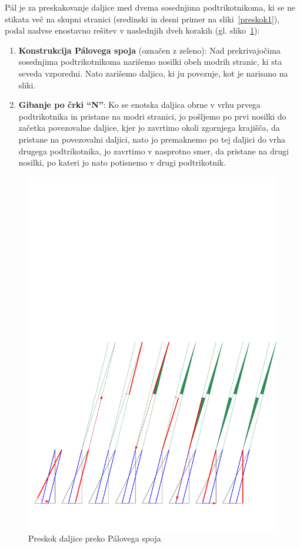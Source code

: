 \documentclass[a4paper, 12pt]{article}
\begin{document}
Pál je za preskakovanje daljice med dvema sosednjima podtrikotnikoma, ki se ne stikata več na skupni stranici (sredinski in desni primer na sliki~\ref{preskok1}), podal nadvse enostavno rešitev v naslednjih dveh korakih (gl. sliko~\ref{pal}):

\begin{enumerate}
    \item \textbf{Konstrukcija Pálovega spoja} (označen z zeleno): Nad prekrivajočima sosednjima podtrikotnikoma narišemo nosilki obeh modrih stranic, ki sta seveda vzporedni. Nato zarišemo daljico, ki ju povezuje, kot je narisano na sliki.
    \item \textbf{Gibanje po črki ``N''}: Ko se enotska daljica obrne v vrhu prvega podtrikotnika in pristane na modri stranici, jo pošljemo po prvi nosilki do začetka povezovalne daljice, kjer jo zavrtimo okoli zgornjega krajišča, da pristane na povezovalni daljici, nato jo premaknemo po tej daljici do vrha drugega podtrikotnika, jo zavrtimo v nasprotno smer, da pristane na drugi nosilki, po kateri jo nato potisnemo v drugi podtrikotnik.
\end{enumerate}

\begin{figure}[h!]
    \centering
    \includegraphics[width=\textwidth]{ipe_slike/pal.pdf}
    \caption{Preskok daljice preko Pálovega spoja}
    \label{pal}
\end{figure}
\end{document}
